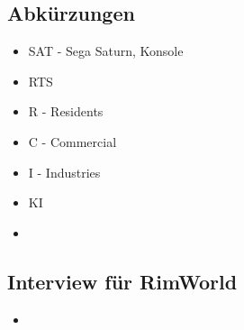 \subsection*{Abkürzungen}
\begin{itemize}
    \item SAT - Sega Saturn, Konsole
    \item RTS
    \item R - Residents
    \item C - Commercial
    \item I - Industries
    \item KI
    \item 
\end{itemize}

\subsection*{Interview für RimWorld}
\begin{itemize}
    \item 
\end{itemize}